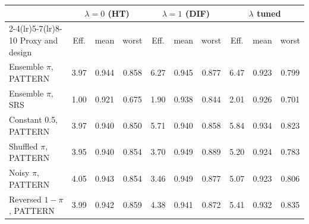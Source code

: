 \begin{tabular}{lccccccccc}
\toprule
 & \multicolumn{3}{c}{$\lambda=0$ (HT)} & \multicolumn{3}{c}{$\lambda=1$ (DIF)} & \multicolumn{3}{c}{$\lambda$ tuned} \\
\cmidrule(lr){2-4}\cmidrule(lr){5-7}\cmidrule(lr){8-10}
Proxy and design & Eff. & mean & worst & Eff. & mean & worst & Eff. & mean & worst \\
\midrule
Ensemble $\pi$, PATTERN & 3.97 & 0.944 & 0.858 & 6.27 & 0.945 & 0.877 & 6.47 & 0.923 & 0.799 \\
Ensemble $\pi$, SRS & 1.00 & 0.921 & 0.675 & 1.90 & 0.938 & 0.844 & 2.01 & 0.926 & 0.701 \\
Constant 0.5, PATTERN & 3.97 & 0.940 & 0.850 & 5.71 & 0.940 & 0.858 & 5.84 & 0.934 & 0.823 \\
Shuffled $\pi$, PATTERN & 3.95 & 0.940 & 0.854 & 3.70 & 0.949 & 0.889 & 5.20 & 0.924 & 0.783 \\
Noisy $\pi$, PATTERN & 4.05 & 0.943 & 0.854 & 3.46 & 0.949 & 0.877 & 5.07 & 0.923 & 0.806 \\
Reversed $1-\pi$, PATTERN & 3.99 & 0.942 & 0.859 & 4.38 & 0.941 & 0.872 & 5.41 & 0.932 & 0.835 \\
\bottomrule
\end{tabular}
